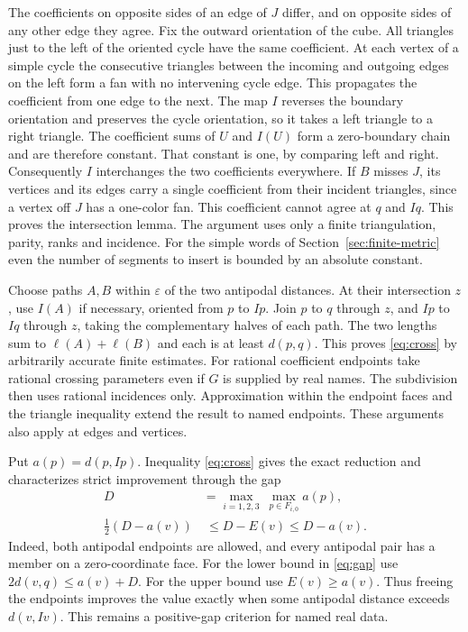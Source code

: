 \documentclass[10pt,letterpaper]{article}
\begin{document}
The coefficients on opposite sides of an edge of $J$ differ, and on
opposite sides of any other edge they agree. Fix the outward
orientation of the cube. All triangles just to the left of the
oriented cycle have the same coefficient. At each vertex of a simple
cycle the consecutive triangles between the incoming and outgoing
edges on the left form a fan with no intervening cycle edge. This
propagates the coefficient from one edge to the next. The map $I$
reverses the boundary orientation and preserves the cycle orientation,
so it takes a left triangle to a right triangle. The coefficient sums
of $U$ and $I(U)$ form a zero-boundary chain and are therefore
constant. That constant is one, by comparing left and right.
Consequently $I$ interchanges the two coefficients everywhere.
If $B$ misses $J$, its vertices and its edges carry a single
coefficient from their incident triangles, since a vertex off $J$ has
a one-color fan. This coefficient cannot agree at $q$ and $Iq$.
This proves the intersection lemma. The argument uses only a finite
triangulation, parity, ranks and incidence. For the simple words of
Section~\ref{sec:finite-metric} even the number of segments to insert
is bounded by an absolute constant.

Choose paths $A,B$ within $\varepsilon$ of the two antipodal
distances. At their intersection $z$, use $I(A)$ if necessary, oriented
from $p$ to $Ip$. Join $p$ to $q$ through $z$, and $Ip$ to $Iq$
through $z$, taking the complementary halves of each path. The two
lengths sum to $\ell(A)+\ell(B)$ and each is at least $d(p,q)$.
This proves \eqref{eq:cross} by arbitrarily accurate finite estimates.
For rational coefficient endpoints take rational crossing parameters
even if $G$ is supplied by real names. The subdivision then uses
rational incidences only. Approximation within the endpoint faces and
the triangle inequality extend the result to named endpoints. These
arguments also apply at edges and vertices.

Put $a(p)=d(p,Ip)$. Inequality \eqref{eq:cross} gives the exact reduction
and characterizes strict improvement through the gap
\begin{align}
 D&=\max_{i=1,2,3}\ \max_{p\in F_{i,0}}a(p), \label{eq:anti-max}\\
 \tfrac12(D-a(v))&\ \le D-E(v)\le D-a(v).
 \label{eq:gap}
\end{align}
Indeed, both antipodal endpoints are allowed, and every antipodal pair
has a member on a zero-coordinate face. For the lower bound in
\eqref{eq:gap} use $2d(v,q)\le a(v)+D$. For the upper bound use
$E(v)\ge a(v)$. Thus freeing the endpoints improves the value exactly
when some antipodal distance exceeds $d(v,Iv)$. This remains a
positive-gap criterion for named real data.
\end{document}
